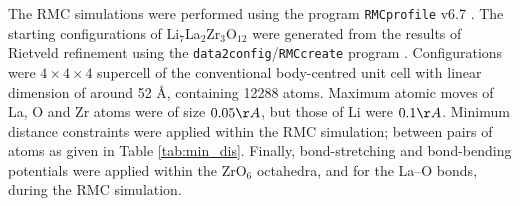 \documentclass[twoside,twocolumn,9pt]{article}
\begin{document}
The RMC simulations were performed using the program \texttt{RMCprofile} v6.7 \cite{Tucker:2007eh}.
The starting configurations of Li$_7$La$_2$Zr$_3$O$_{12}$ were generated from the results of Rietveld refinement using the \texttt{data2config}/\texttt{RMCcreate} program \cite{Dove:2013gk}. Configurations were $4\times 4\times 4$ supercell of the conventional body-centred unit cell with linear dimension of around 52 \AA, containing 12288 atoms. Maximum atomic moves of La, O and Zr atoms were of size $0.05 \AA$, but those of Li were $0.1 \AA$. Minimum distance constraints were applied within the RMC simulation; between  pairs of atoms as given in Table  \ref{tab:min_dis}. Finally, bond-stretching and bond-bending potentials were applied within the ZrO$_6$ octahedra, and for the La--O bonds, during the RMC simulation.
\end{document}
